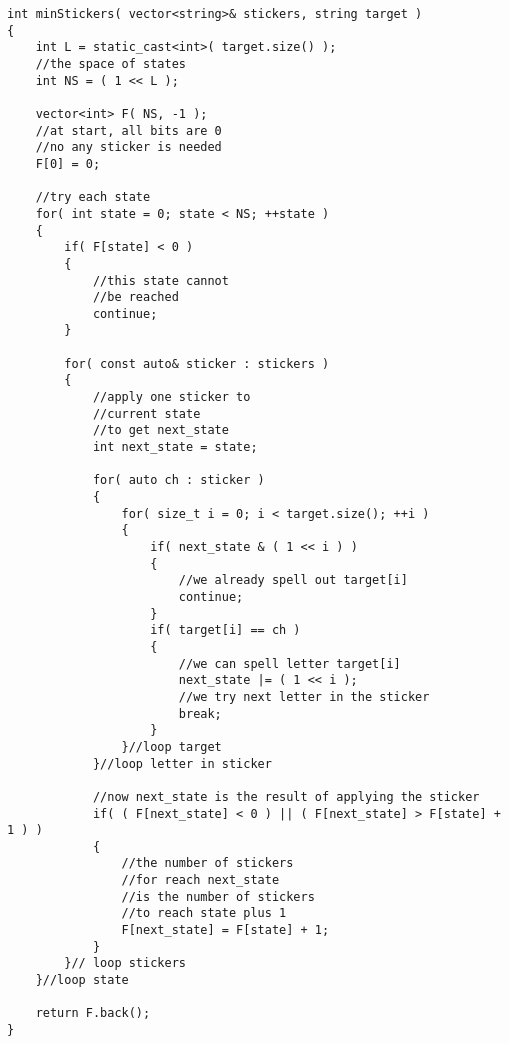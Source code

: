 \setcounter{lstlisting}{0}
\begin{lstlisting}[style=customc, caption={Dynamic Progamming}]
int minStickers( vector<string>& stickers, string target )
{
    int L = static_cast<int>( target.size() );
    //the space of states
    int NS = ( 1 << L );

    vector<int> F( NS, -1 );
    //at start, all bits are 0
    //no any sticker is needed
    F[0] = 0;

    //try each state
    for( int state = 0; state < NS; ++state )
    {
        if( F[state] < 0 )
        {
            //this state cannot
            //be reached
            continue;
        }

        for( const auto& sticker : stickers )
        {
            //apply one sticker to
            //current state
            //to get next_state
            int next_state = state;

            for( auto ch : sticker )
            {
                for( size_t i = 0; i < target.size(); ++i )
                {
                    if( next_state & ( 1 << i ) )
                    {
                        //we already spell out target[i]
                        continue;
                    }
                    if( target[i] == ch )
                    {
                        //we can spell letter target[i]
                        next_state |= ( 1 << i );
                        //we try next letter in the sticker
                        break;
                    }
                }//loop target
            }//loop letter in sticker

            //now next_state is the result of applying the sticker
            if( ( F[next_state] < 0 ) || ( F[next_state] > F[state] + 1 ) )
            {
                //the number of stickers
                //for reach next_state
                //is the number of stickers
                //to reach state plus 1
                F[next_state] = F[state] + 1;
            }
        }// loop stickers
    }//loop state

    return F.back();
}
\end{lstlisting}
